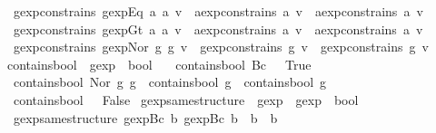 \begin{isabellebody}
\ \ {\isachardoublequoteopen}gexp{\isacharunderscore}constrains\ {\isacharparenleft}gexp{\isachardot}Eq\ a{}\ a{}{\isacharparenright}\ v\ {\isacharequal}\ {\isacharparenleft}aexp{\isacharunderscore}constrains\ a{}\ v\ {\isasymor}\ aexp{\isacharunderscore}constrains\ a{}\ v{\isacharparenright}{\isachardoublequoteclose}\ {\isacharbar}\isanewline
\ \ {\isachardoublequoteopen}gexp{\isacharunderscore}constrains\ {\isacharparenleft}gexp{\isachardot}Gt\ a{}\ a{}{\isacharparenright}\ v\ {\isacharequal}\ {\isacharparenleft}aexp{\isacharunderscore}constrains\ a{}\ v\ {\isasymor}\ aexp{\isacharunderscore}constrains\ a{}\ v{\isacharparenright}{\isachardoublequoteclose}\ {\isacharbar}\isanewline
\ \ {\isachardoublequoteopen}gexp{\isacharunderscore}constrains\ {\isacharparenleft}gexp{\isachardot}Nor\ g{}\ g{}{\isacharparenright}\ v\ {\isacharequal}\ {\isacharparenleft}gexp{\isacharunderscore}constrains\ g{}\ v\ {\isasymor}\ gexp{\isacharunderscore}constrains\ g{}\ v{\isacharparenright}{\isachardoublequoteclose}\isanewline
\isanewline
{}\isamarkupfalse%
\ contains{\isacharunderscore}bool\ {\isacharcolon}{\isacharcolon}\ {\isachardoublequoteopen}gexp\ {\isasymRightarrow}\ bool{\isachardoublequoteclose}\ \isanewline
\ \ {\isachardoublequoteopen}contains{\isacharunderscore}bool\ {\isacharparenleft}Bc\ {\isacharunderscore}{\isacharparenright}\ {\isacharequal}\ True{\isachardoublequoteclose}\ {\isacharbar}\isanewline
\ \ {\isachardoublequoteopen}contains{\isacharunderscore}bool\ {\isacharparenleft}Nor\ g{}\ g{}{\isacharparenright}\ {\isacharequal}\ {\isacharparenleft}contains{\isacharunderscore}bool\ g{}\ {\isasymor}\ contains{\isacharunderscore}bool\ g{}{\isacharparenright}{\isachardoublequoteclose}\ {\isacharbar}\isanewline
\ \ {\isachardoublequoteopen}contains{\isacharunderscore}bool\ {\isacharunderscore}\ {\isacharequal}\ False{\isachardoublequoteclose}\isanewline
\isanewline
{}\isamarkupfalse%
\ gexp{\isacharunderscore}same{\isacharunderscore}structure\ {\isacharcolon}{\isacharcolon}\ {\isachardoublequoteopen}gexp\ {\isasymRightarrow}\ gexp\ {\isasymRightarrow}\ bool{\isachardoublequoteclose}\ \isanewline
\ \ {\isachardoublequoteopen}gexp{\isacharunderscore}same{\isacharunderscore}structure\ {\isacharparenleft}gexp{\isachardot}Bc\ b{\isacharparenright}\ {\isacharparenleft}gexp{\isachardot}Bc\ b{\isacharprime}{\isacharparenright}\ {\isacharequal}\ {\isacharparenleft}b\ {\isacharequal}\ b{\isacharprime}{\isacharparenright}{\isachardoublequoteclose}\ {\isacharbar}\isanewline

\end{isabellebody}

